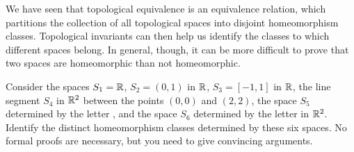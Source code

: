 \begin{comment}

\ActivitySolution

\ba

	\item  Every interior point of the interval $[0,1]$ is a cut point, but the unit circle has no cut points. 

	\item  The answer is no. Any set of two distinct points is a cut set of $A$, but $A \cup B$ has only one set of two points that is a cut set.  
 
\ea

\end{comment}

We have seen that topological equivalence is an equivalence relation, which partitions the collection of all topological spaces into disjoint homeomorphism classes. Topological invariants can then help us identify the classes to which different spaces belong. In general, though, it can be more difficult to prove that two spaces are homeomorphic than not homeomorphic. 

\begin{activity} Consider the spaces $S_1 = \mathbb{R}$, $S_2 = (0,1)$ in $\mathbb{R}$, $S_3 = [-1,1]$ in $\mathbb{R}$, the line segment $S_4$ in $\mathbb{R}^2$ between the points $(0,0)$ and $(2,2)$, the space $S_5$ determined by the letter {\selectfont{X}}, and the space $S_6$ determined by the letter {\selectfont{Y}} in $\mathbb{R}^2$. Identify the distinct homeomorphism classes determined by these six spaces. No formal proofs are necessary, but you need to give convincing arguments. 

\end{activity}

\begin{comment}

\ActivitySolution We have already shown that $\R$ and $(0,1)$ are homeomorphic spaces. Thus, $[\R] =[(0,1)]$. Since $S_3$ and $S_4$ contain points that are not cut points, we conclude that neither space is in $[\R]$. Removing the center point in $S_5$ cuts $S_5$ into four connected components, and no point in $\R$ does the same. So $S_5 \notin [\R]$. Similarly, removing the middle point from $S_6$ cuts $S_6$ into three connected components. So $S_6 \notin [\R]$. Therefore, only $S_1$ and $S_2$ belong to $[\R]$. 

The function $f: S_3 \to S_4$ defined by $f(x) = (x+1, x+1)$ is linear in both components, so is a homeomorphism. Thus, $[S_3]= [S_4]$. For the same reason as above, neither $S_5$ nor $S_6$ is in $[S_3]$. Therefore, only $S_3$ and $S_4$ are in $[S_3]$. 

Finally, there is no point in $S_5$ that cuts $S_5$ into three connected components, so $[S_5] \neq [S_6]$. We conclude that the distinct classes are $[S_1]$, $[S_3]$, $[S_5]$, and $[S_6]$. 

\end{comment}

